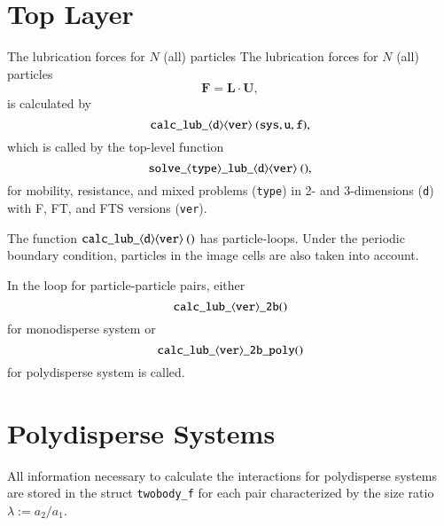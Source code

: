 \documentclass[twocolumn]{book}
\begin{document}
\section{Top Layer}
The lubrication forces for $N$ (all) particles 
The lubrication forces for $N$ (all) particles 
\begin{equation}
  \bm{F}
  =
  \bm{L}
  \cdot
  \bm{U}
  ,
\end{equation}
is calculated by
\begin{equation}
  {\tt calc\_lub\_\langle d\rangle\langle ver\rangle\ (sys, u, f)}
  ,
\end{equation}
which is called by the top-level function
\begin{equation}
  {\tt solve\_\langle type\rangle\_lub\_\langle d\rangle\langle ver\rangle\ ()}
  ,
\end{equation}
for mobility, resistance, and mixed problems ({\tt type}) 
in 2- and 3-dimensions ({\tt d}) 
with F, FT, and FTS versions ({\tt ver}).

The function ${\tt calc\_lub\_\langle d\rangle\langle ver\rangle\ ()}$ 
has particle-loops.
Under the periodic boundary condition, particles in the image cells 
are also taken into account.

In the loop for particle-particle pairs, 
either 
\begin{equation}
  {\tt calc\_lub\_\langle ver\rangle\_2b()}
\end{equation}
for monodisperse system or
\begin{equation}
  {\tt calc\_lub\_\langle ver\rangle\_2b\_poly()}
\end{equation}
for polydisperse system is called.


\section{Polydisperse Systems}
All information necessary to calculate the interactions for 
polydisperse systems are stored in the struct {\tt twobody\_f} 
for each pair characterized by the size ratio 
$\lambda := a_2 / a_1$. 
\end{document}
